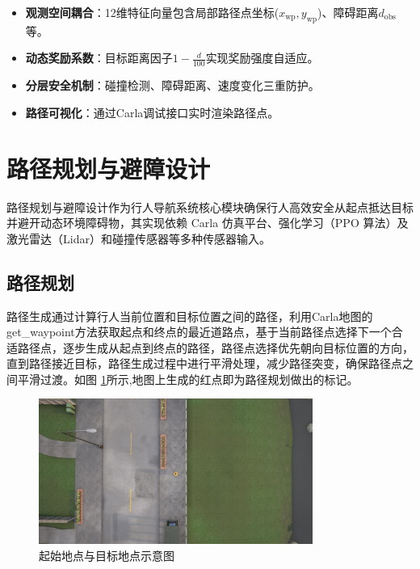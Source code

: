 	\begin{itemize}
	    \item \textbf{观测空间耦合}：12维特征向量包含局部路径点坐标($x_{\text{wp}}, y_{\text{wp}}$)、障碍距离$d_{\text{obs}}$等。
	    \item \textbf{动态奖励系数}：目标距离因子$1 - \frac{d}{100}$实现奖励强度自适应。
	    \item \textbf{分层安全机制}：碰撞检测、障碍距离、速度变化三重防护。
	    \item \textbf{路径可视化}：通过Carla调试接口实时渲染路径点。
	\end{itemize}
	
	\section{路径规划与避障设计}
	
	路径规划与避障设计作为行人导航系统核心模块确保行人高效安全从起点抵达目标并避开动态环境障碍物，其实现依赖 Carla 仿真平台、强化学习（PPO 算法）及激光雷达（Lidar）和碰撞传感器等多种传感器输入。
	
	\subsection{路径规划}
	
	路径生成通过计算行人当前位置和目标位置之间的路径，利用Carla地图的get\_waypoint方法获取起点和终点的最近道路点，基于当前路径点选择下一个合适路径点，逐步生成从起点到终点的路径，路径点选择优先朝向目标位置的方向，直到路径接近目标，路径生成过程中进行平滑处理，减少路径突变，确保路径点之间平滑过渡。如图 \ref{fig:way}所示,地图上生成的红点即为路径规划做出的标记。
	
	\begin{figure}[H]
	    \centering
	    \includegraphics[width=0.8\textwidth]{images/path_waypoint.pdf}
	    \caption{起始地点与目标地点示意图}
	    \label{fig:way}
	\end{figure}
	

